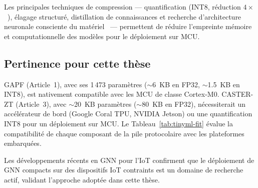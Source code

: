 Les principales techniques de compression --- quantification (INT8, réduction $4\times$~\cite{Bianchi2021QuantizedGNN}), élagage structuré, distillation de connaissances et recherche d'architecture neuronale consciente du matériel~\cite{Cai2020OFA, Lin2020MCUNet} --- permettent de réduire l'empreinte mémoire et computationnelle des modèles pour le déploiement sur MCU.

\subsection{Pertinence pour cette thèse}

GAPF (Article~1), avec ses 1\,473 paramètres ($\sim$6~KB en FP32, $\sim$1.5~KB en INT8), est nativement compatible avec les MCU de classe Cortex-M0. CASTER-ZT (Article~3), avec $\sim$20~KB paramètres ($\sim$80~KB en FP32), nécessiterait un accélérateur de bord (Google Coral TPU, NVIDIA Jetson) ou une quantification INT8 pour un déploiement sur MCU. Le Tableau~\ref{tab:tinyml-fit} évalue la compatibilité de chaque composant de la pile protocolaire avec les plateformes embarquées.

\begin{table}[htbp]
\centering
\caption{Compatibilité des composants de la pile protocolaire avec les plateformes embarquées. FP32~: virgule flottante 32 bits. INT8~: entier 8 bits quantifié.}
\label{tab:tinyml-fit}
\end{table}

Les développements récents en GNN pour l'IoT \cite{Nguyen2025GNNIoT} confirment que le déploiement de GNN compacts sur des dispositifs IoT contraints est un domaine de recherche actif, validant l'approche adoptée dans cette thèse.


